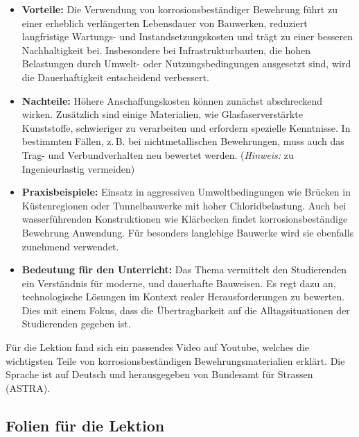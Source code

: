 \documentclass[
11pt,
captions=tableheading,
headsepline,
footsepline, 
captions=tableheading,
parskip=half-,
]{scrartcl}
\begin{document}
\begin{itemize}
    \item \textbf{Vorteile:} Die Verwendung von korrosionsbeständiger Bewehrung führt zu einer erheblich verlängerten Lebensdauer von Bauwerken, reduziert langfristige Wartungs- und Instandsetzungskosten und trägt zu einer besseren Nachhaltigkeit bei. Insbesondere bei Infrastrukturbauten, die hohen Belastungen durch Umwelt- oder Nutzungsbedingungen ausgesetzt sind, wird die Dauerhaftigkeit entscheidend verbessert.
    
    \item \textbf{Nachteile:} Höhere Anschaffungskosten können zunächst abschreckend wirken. Zusätzlich sind einige Materialien, wie Glasfaserverstärkte Kunststoffe, schwieriger zu verarbeiten und erfordern spezielle Kenntnisse. In bestimmten Fällen, z.\,B. bei nichtmetallischen Bewehrungen, muss auch das Trag- und Verbundverhalten neu bewertet werden. (\textit{Hinweis:} zu Ingenieurlastig vermeiden)
    
    \item \textbf{Praxisbeispiele:} Einsatz in aggressiven Umweltbedingungen wie Brücken in Küstenregionen oder Tunnelbauwerke mit hoher Chloridbelastung. Auch bei wasserführenden Konstruktionen wie Klärbecken findet korrosionsbeständige Bewehrung Anwendung. Für besonders langlebige Bauwerke wird sie ebenfalls zunehmend verwendet.
    
    \item \textbf{Bedeutung für den Unterricht:} Das Thema vermittelt den Studierenden ein Verständnis für moderne,  und dauerhafte Bauweisen. Es regt dazu an, technologische Lösungen im Kontext realer Herausforderungen zu bewerten. Dies mit einem Fokus, dass die Übertragbarkeit auf die Alltagsituationen der Studierenden gegeben ist.
\end{itemize}


Für die Lektion fand sich ein passendes Video auf Youtube, welches die wichtigsten Teile von korrosionsbeständigen Bewehrungsmaterialien erklärt.
Die Sprache ist auf Deutsch und herausgegeben von Bundesamt für Strassen (ASTRA).

\clearpage
\subsection{Folien für die Lektion}

\end{document}
